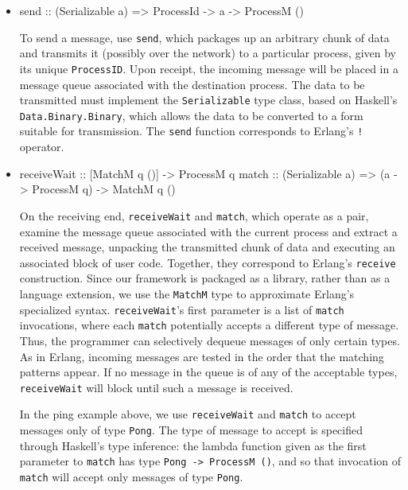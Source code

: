 \documentclass[preprint]{sigplanconf}
\begin{document}
\begin{itemize}
\item 
\begin{code}
send :: (Serializable a) => ProcessId -> a -> ProcessM ()
\end{code}

To send a message, use \texttt{send}, which packages up an arbitrary chunk of data and transmits it (possibly over the network) to a particular process, given by its unique \texttt{ProcessID}. Upon receipt, the incoming message will be placed in a message queue associated with the destination process. The data to be transmitted must implement the \texttt{Serializable} type class, based on Haskell's \texttt{Data.Binary.Binary}, which allows the data to be converted to a form suitable for transmission. The \texttt{send} function corresponds to Erlang's \texttt{!} operator.

\item 
\begin{code}
receiveWait :: [MatchM q ()] -> ProcessM q
match :: (Serializable a) => (a -> ProcessM q) -> MatchM q ()
\end{code}

On the receiving end, \texttt{receiveWait} and \texttt{match}, which operate as a pair, examine the message queue associated with the current process and extract a received message, unpacking the transmitted chunk of data and executing an associated block of user code. Together, they correspond to Erlang's \texttt{receive} construction. Since our framework is packaged as a library, rather than as a language extension, we use the \texttt{MatchM} type to approximate Erlang's specialized syntax. \texttt{receiveWait}'s first parameter is a list of \texttt{match} invocations, where each \texttt{match} potentially accepts a different type of message. Thus, the programmer can selectively dequeue messages of only certain types. As in Erlang, incoming messages are tested in the order that the matching patterns appear. If no message in the queue is of any of the acceptable types, \texttt{receiveWait} will block until such a message is received. %

In the ping example above, we use \texttt{receiveWait} and \texttt{match} to accept messages only of type \texttt{Pong}. The type of message to accept is specified through Haskell's type inference: the lambda function given as the first parameter to \texttt{match} has type \lstinline!Pong -> ProcessM ()!, and so that invocation of \texttt{match} will accept only messages of type \texttt{Pong}.
\end{itemize}
\end{document}
